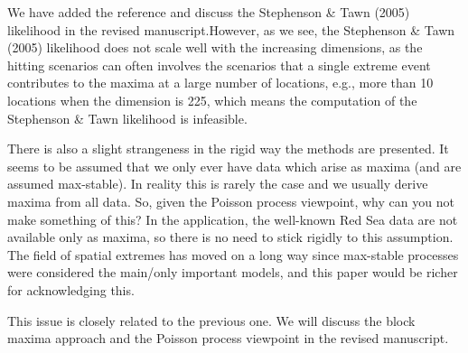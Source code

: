 \documentclass[12pt
]{article}
\begin{document}
\begin{Res}
We have added the reference \citep{Wadsworth.Tawn:2014} and discuss the Stephenson \& Tawn (2005) likelihood in the revised manuscript.However, as we see, the Stephenson \& Tawn (2005) likelihood does not scale well with the increasing dimensions, as the hitting scenarios can often involves the scenarios that a single extreme event contributes to the maxima at a large number of locations, e.g., more than 10 locations when the dimension is 225, which means the computation of the Stephenson \& Tawn likelihood is infeasible. 
\end{Res}

\begin{Comments}
There is also a slight strangeness in the rigid way the methods are presented. It seems to be assumed that we only ever have data which arise as maxima (and are assumed max-stable). In reality this is rarely the case and we usually derive maxima from all data. So, given the Poisson process viewpoint, why can you not make something of this? In the application, the well-known Red Sea data are not available only as maxima, so there is no need to stick rigidly to this assumption. The field of spatial extremes has moved on a long way since max-stable processes were considered the main/only important models, and this paper would be richer for acknowledging this.
\end{Comments}

\begin{Res}
This issue is closely related to the previous one. We will discuss the block maxima approach and the Poisson process viewpoint in the revised manuscript.
\end{Res}

\dashline


\end{document}
